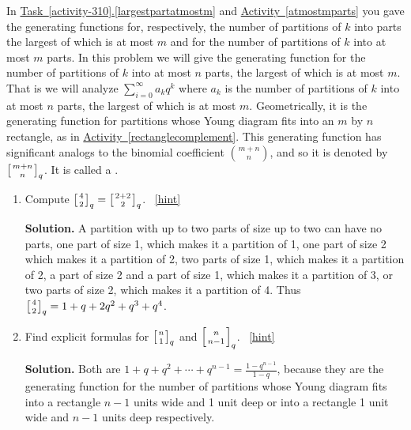 \documentclass{book}
\begin{document}
\setcounter{project}{327}
\addtocounter{project}{-1}
\begin{activity}[]\label{qtorialformula}
\hypertarget{p-1684}{}%
In \hyperref[largestpartatmostm]{Task~\ref{activity-310}.\ref{largestpartatmostm}} and \hyperref[atmostmparts]{Activity~\ref{atmostmparts}} you gave the generating functions for, respectively, the number of partitions of \(k\) into parts the largest of which is at most \(m\) and for the number of partitions of \(k\) into at most \(m\) parts. In this problem we will give the generating function for the number of partitions of \(k\) into at most \(n\) parts, the largest of which is at most \(m\). That is we will analyze \(\sum_{i=0}^\infty a_kq^k\) where \(a_k\) is the number of partitions of \(k\) into at most \(n\) parts, the largest of which is at most \(m\). Geometrically, it is the generating function for partitions whose Young diagram fits into an \(m\) by \(n\) rectangle, as in \hyperref[rectanglecomplement]{Activity~\ref{rectanglecomplement}}. This generating function has significant analogs to the binomial coefficient \(\binom{m+n}{n}\), and so it is denoted by \(\left[{m+n\atop n}\right]_q\). It is called a .%
\begin{enumerate}[font=\bfseries,label=(\alph*),ref=\alph*]
\item\label{task-282} \hypertarget{p-1685}{}%
Compute \(\left[{4\atop2}\right]_q=\left[{2+2\atop2}\right]_q\).%
~\hfill{\tiny\hyperlink{a-327.a}{[hint]}\hypertarget{q-327.a}{}}\par\smallskip%
\noindent\textbf{Solution.}\hypertarget{solution-263}{}\quad%
\hypertarget{p-1687}{}%
A partition with up to two parts of size up to two can have no parts, one part of size 1, which makes it a partition of 1, one part of size 2 which makes it a partition of 2, two parts of size 1, which makes it a partition of 2, a part of size 2 and a part of size 1, which makes it a partition of 3, or two parts of size 2, which makes it a partition of 4. Thus \(\left[{4\atop2}\right]_q=1+q+2q^2+q^3+q^4\).%
\item\label{task-283} \hypertarget{p-1688}{}%
Find explicit formulas for \(\left[{n\atop1}\right]_q\) and \(\left[{n\atop n-1}\right]_q\).%
~\hfill{\tiny\hyperlink{a-327.b}{[hint]}\hypertarget{q-327.b}{}}\par\smallskip%
\noindent\textbf{Solution.}\hypertarget{solution-264}{}\quad%
\hypertarget{p-1690}{}%
Both are \(1+q+q^2+\cdots+q^{n-1} = \frac{1-q^{n-1}}{1-q}\), because they are the generating function for the number of partitions whose Young diagram fits into a rectangle \(n-1\) units wide and 1 unit deep or into a rectangle 1 unit wide and \(n-1\) units deep respectively.%

\end{enumerate}
\end{activity}
\end{document}
